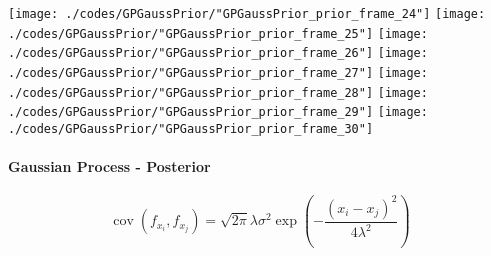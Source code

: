 \begin{frame}{\insertsection}
\begin{center}
{\begin{animateinline}{15}
				 \texttt{[image: ./codes/GPGaussPrior/"GPGaussPrior\_prior\_frame\_24"]}\newframe
				 \texttt{[image: ./codes/GPGaussPrior/"GPGaussPrior\_prior\_frame\_25"]}\newframe
				 \texttt{[image: ./codes/GPGaussPrior/"GPGaussPrior\_prior\_frame\_26"]}\newframe
				 \texttt{[image: ./codes/GPGaussPrior/"GPGaussPrior\_prior\_frame\_27"]}\newframe
				 \texttt{[image: ./codes/GPGaussPrior/"GPGaussPrior\_prior\_frame\_28"]}\newframe
				 \texttt{[image: ./codes/GPGaussPrior/"GPGaussPrior\_prior\_frame\_29"]}\newframe
				 \texttt{[image: ./codes/GPGaussPrior/"GPGaussPrior\_prior\_frame\_30"]}
			 \end{animateinline}
			}
	\end{center}
    
\end{frame}

\begin{frame}{\insertsection}
    \framesubtitle{Gaussian Process - Posterior}
	
	\begin{equation*}
		\operatorname{cov}\left(f_{x_{i}}, f_{x_{j}}\right) =\sqrt{2 \pi} \lambda \sigma^{2} \exp \left(-\frac{\left(x_{i}-x_{j}\right)^{2}}{4 \lambda^{2}}\right)
	\end{equation*}

    \begin{center}
		

\end{center}
\end{frame}
